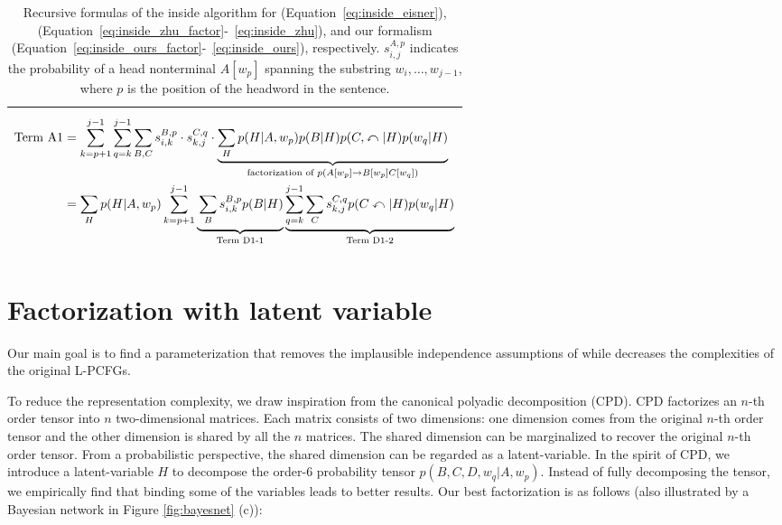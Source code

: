 \documentclass[11pt,a4paper]{article}
\begin{document}
\begin{table*}[!ht]
{\begin{tabular}{l}
\begin{minipage}{\linewidth}
{\begin{align}
					\label{eq:inside_ours_factor}
					\text{Term A1} &= \sum_{k=p+1}^{j - 1}\sum_{q=k}^{j - 1}\sum_{B, C}   s_{i, k}^{B,p} \cdot s_{k, j}^{C,q} \cdot\underbrace{\sum_{H} p(H | A, w_{p}) p(B | H)  p(C, \curvearrowleft | H)  p( w_{q} | H)}_{\text{factorization of } p(A[w_{p}] \rightarrow B[w_{p}] C[w_{q}])} \\
					\label{eq:inside_ours}
					&=  \sum_{H}  p(H |A, w_p) \sum_{k=p+1}^{j - 1} \underbrace{\vphantom{\sum_{q=k}^{j - 1}}\sum_{B} s_{i, k}^{B, p} p(B | H)}_{\text{Term D1-1}}  \underbrace{\sum_{q=k}^{j - 1}\sum_{C} s_{k, j}^{C,q} p (C \curvearrowleft | H) p( w_q | H)}_{\text{Term D1-2}}
					\end{align}}
				\vspace{-.5em}
			\end{minipage}\\
			\bottomrule
	\end{tabular}}
	\caption{
		\label{tab:inside_equations}
		Recursive formulas of the inside algorithm for \citet{eisner-satta-1999-efficient} (Equation~\ref{eq:inside_eisner}), \citet{zhu-etal-2020-return} (Equation~\ref{eq:inside_zhu_factor}-~\ref{eq:inside_zhu}), and our formalism (Equation~\ref{eq:inside_ours_factor}-~\ref{eq:inside_ours}), respectively. $s_{i, j}^{A, p}$ indicates the probability of a head nonterminal $A[w_p]$ spanning the substring $w_i,\ldots,w_{j-1}$, where $p$ is the position of the headword in the sentence.
	}
\end{table*}







\section{Factorization with latent variable}

Our main goal is to find a parameterization that removes the implausible independence assumptions of \citet{zhu-etal-2020-return} while decreases the complexities of the original L-PCFGs.



To reduce the representation complexity, we draw inspiration from the canonical polyadic decomposition (CPD). CPD factorizes an $n$-th order tensor into $n$ two-dimensional matrices. Each matrix consists of two dimensions: one dimension comes from the original $n$-th order tensor and the other dimension is shared by all the $n$ matrices. The shared dimension can be marginalized to recover the original $n$-th order tensor. From a probabilistic perspective, the shared dimension can be regarded as a latent-variable. In the spirit of CPD, we introduce a latent-variable $H$ to decompose the order-6 probability tensor $p(B, C, D, w_q | A, w_p)$. Instead of fully decomposing the tensor, we empirically find that binding some of the variables leads to better results. Our best factorization is as follows (also illustrated by a Bayesian network in Figure \ref{fig:bayesnet} (c)):
\end{document}
